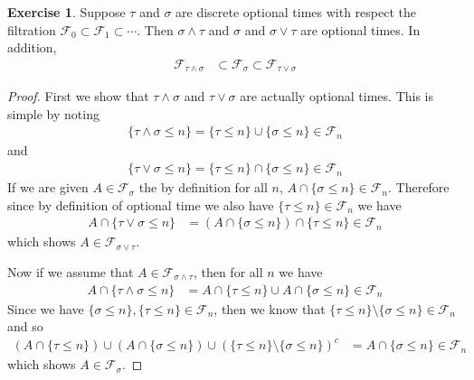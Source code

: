 \documentclass{amsart}
\theoremstyle{remark}
\theoremstyle{definition}
\newtheorem{ex}[thm]{Exercise}
\begin{document}
\begin{ex}Suppose $\tau$ and $\sigma$ are discrete optional
  times with respect the filtration $\mathcal{F}_0 \subset
  \mathcal{F}_1 \subset \cdots$. Then $\sigma \wedge \tau$ and
  $\sigma$ and $\sigma \vee \tau$ are optional times.  In addition, 
\begin{align*}
\mathcal{F}_{\tau \wedge
    \sigma} &\subset \mathcal{F}_\sigma \subset \mathcal{F}_{\tau \vee
    \sigma}
\end{align*}
\end{ex}
\begin{proof}
First we show that $\tau \wedge \sigma$ and $\tau \vee \sigma$ are
actually optional times.  This is simple by noting
\begin{align*}
\lbrace \tau \wedge \sigma \leq n \rbrace = \lbrace \tau \leq n
\rbrace \cup \lbrace \sigma \leq n \rbrace \in \mathcal{F}_n
\end{align*}
and
\begin{align*}
\lbrace \tau \vee \sigma \leq n \rbrace = \lbrace \tau \leq n
\rbrace \cap \lbrace \sigma \leq n \rbrace \in \mathcal{F}_n
\end{align*}
If we are given $A \in \mathcal{F}_\sigma$ the by definition for all
$n$, $A \cap \lbrace \sigma \leq n \rbrace \in \mathcal{F}_n$.
Therefore since by definition of optional time we also have $\lbrace
\tau \leq n \rbrace \in \mathcal{F}_n$ we have
\begin{align*}
A \cap \lbrace \tau \vee \sigma \leq n \rbrace &= (A \cap \lbrace \sigma \leq n
\rbrace) \cap \lbrace \tau \leq n \rbrace \in \mathcal{F}_n
\end{align*}
which shows $A \in \mathcal{F}_{\sigma \vee \tau}$.

Now if we assume that $A \in \mathcal{F}_{\sigma \wedge \tau}$, then
for all $n$ we have
\begin{align*}
A \cap \lbrace \tau \wedge \sigma \leq n \rbrace &= A \cap \lbrace \tau \leq n
\rbrace \cup A \cap \lbrace \sigma \leq n \rbrace \in \mathcal{F}_n
\end{align*}
Since we have $\lbrace \sigma \leq n \rbrace, \lbrace \tau \leq n
\rbrace \in \mathcal{F}_n$, then we know that $\lbrace \tau \leq n
\rbrace \setminus \lbrace \sigma \leq n\rbrace \in \mathcal{F}_n$ and
so 
\begin{align*}
\left( A \cap \lbrace \tau \leq n
\rbrace \right ) \cup \left (A \cap \lbrace \sigma \leq n \rbrace
\right ) \cup \left ( \lbrace \tau \leq n
\rbrace \setminus \lbrace \sigma \leq n\rbrace\right)^c &= A \cap \lbrace \sigma \leq n
\rbrace \in \mathcal{F}_n
\end{align*}
which shows $A \in \mathcal{F}_\sigma$.
\end{proof}
\end{document}
